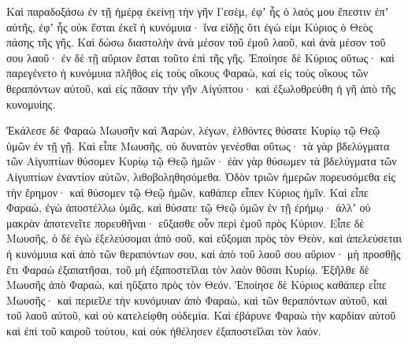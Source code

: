 {Καὶ παραδοξάσω ἐν τῇ ἡμέρᾳ ἐκείνῃ τὴν γῆν Γεσὲμ, ἐφʼ ἧς ὁ λαός μου ἔπεστιν ἐπʼ αὐτῆς, ἐφʼ ἧς οὐκ ἔσται ἐκεῖ ἡ κυνόμυια· ἵνα εἰδῇς ὅτι ἐγώ εἰμι Κύριος ὁ Θεὸς πάσης τῆς γῆς.
Καὶ δώσω διαστολὴν ἀνὰ μέσον τοῦ ἐμοῦ λαοῦ, καὶ ἀνὰ μέσον τοῦ σου λαοῦ· ἐν δὲ τῇ αὔριον ἔσται τοῦτο ἐπὶ τῆς γῆς.
Ἐποίησε δὲ Κύριος οὕτως· καὶ παρεγένετο ἡ κυνόμυια πλῆθος εἰς τοὺς οἴκους Φαραὼ, καὶ εἰς τοὺς οἴκους τῶν θεραπόντων αὐτοῦ, καὶ εἰς πᾶσαν τὴν γῆν Αἰγύπτου· καὶ ἐξωλοθρεύθη ἡ γῆ ἀπὸ τῆς κυνομυίης.
\par }{\PP {}Ἐκάλεσε δὲ Φαραὼ Μωυσῆν καὶ Ἀαρὼν, λέγων, ἐλθόντες θύσατε Κυρίῳ τῷ Θεῷ ὑμῶν ἐν τῇ γῇ.
Καὶ εἶπε Μωυσῆς, οὐ δυνατὸν γενέσθαι οὕτως· τὰ γὰρ βδελύγματα τῶν Αἰγυπτίων θύσομεν Κυρίῳ τῷ Θεῷ ἡμῶν· ἐὰν γὰρ θύσωμεν τὰ βδελύγματα τῶν Αἰγυπτίων ἐναντίον αὐτῶν, λιθοβοληθησόμεθα.
Ὁδὸν τριῶν ἡμερῶν πορευσόμεθα εἰς τὴν ἔρημον· καὶ θύσομεν τῷ Θεῷ ἡμῶν, καθάπερ εἶπεν Κύριος ἡμῖν.
Καὶ εἶπε Φαραὼ, ἐγὼ ἀποστέλλω ὑμᾶς, καὶ θύσατε τῷ Θεῷ ὑμῶν ἐν τῇ ἐρήμῳ· ἀλλʼ οὐ μακρὰν ἀποτενεῖτε πορευθῆναι· εὔξασθε οὖν περὶ ἐμοῦ πρὸς Κύριον.
Εἶπε δὲ Μωυσῆς, ὁ δὲ ἐγὼ ἐξελεύσομαι ἀπὸ σοῦ, καὶ εὔξομαι πρὸς τὸν Θεὸν, καὶ ἀπελεύσεται ἡ κυνόμυια καὶ ἀπὸ τῶν θεραπόντων σου, καὶ ἀπὸ τοῦ λαοῦ σου αὔριον· μὴ προσθῇς ἔτι Φαραὼ ἐξαπατῆσαι, τοῦ μὴ ἐξαποστεῖλαι τὸν λαὸν θῦσαι Κυρίῳ.
Ἐξῆλθε δὲ Μωυσῆς ἀπὸ Φαραὼ, καὶ ηὔξατο πρὸς τὸν Θεόν.
Ἐποίησε δὲ Κύριος καθάπερ εἶπε Μωυσῆς· καὶ περιεῖλε τὴν κυνόμυιαν ἀπὸ Φαραὼ, καὶ τῶν θεραπόντων αὐτοῦ, καὶ τοῦ λαοῦ αὐτοῦ, καὶ οὐ κατελείφθη οὐδεμία.
Καὶ ἐβάρυνε Φαραὼ τὴν καρδίαν αὐτοῦ καὶ ἐπὶ τοῦ καιροῦ τούτου, καὶ οὐκ ἠθέλησεν ἐξαποστεῖλαι τὸν λαόν.

}
